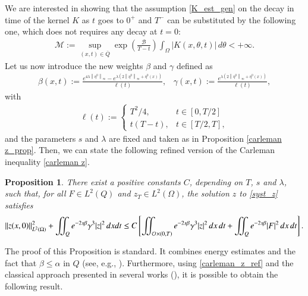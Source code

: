 \documentclass[preprint,1p]{elsarticle}
\newcommand{\D}{\displaystyle}
\newcommand{\norm}[2]{\left\|#1\right\|_{#2}}
\newcommand{\intd}{\displaystyle\int \kern -7pt \int}
\newtheorem{proposition}{\bf Proposition}[section]
\begin{document}
We are interested in showing that the assumption \eqref{K_est_gen} on the decay in time of the kernel $K$ as $t$ goes to $0^+$ and $T^-$ can be substituted by the following one, which does not requires any decay at $t=0$:
\begin{align}\label{K_est_weak}
	\mathcal{M}:=\sup_{(x,t)\in\overline{Q}}\exp\left(\frac{\mathcal{B}}{T-t}\right)\int_{\Omega} |K(x,\theta,t)|\,d\theta <+\infty.
\end{align}
Let us now introduce the new weights $\beta$ and $\gamma$ defined as
%
\begin{align*}
	\beta(x,t):=\frac{e^{4\lambda\norm{\eta^0}{\infty}}-e^{\lambda\left(2\norm{\eta^0}{\infty}+\eta^0(x)\right)}}{\ell(t)}, \;\;\; \gamma(x,t):=\frac{e^{\lambda\left(2\norm{\eta^0}{\infty}+\eta^0(x)\right)}}{\ell(t)},
\end{align*}
with
\begin{align*}
	\ell(t):=\begin{cases}
		\D T^2/4, & t\in\left[0,T/2\right]
		\\
		\D t(T-t), & t\in\left[T/2, T\right],
	\end{cases}
\end{align*}
and the parameters $s$ and $\lambda$ are fixed and taken as in Proposition \ref{carleman z_prop}. Then, we can state the following refined version of the Carleman inequality \eqref{carleman z}.

\begin{proposition}
There exist a positive constants $C$, depending on $T$, $s$ and $\lambda$, such that, for all $F\in L^2(Q)$ and $z_T\in L^2(\Omega)$, the solution $z$ to \eqref{syst_z} satisfies 
\begin{align}\label{carleman_z_ref}
	\norm{z(x,0)}{L^2(\Omega)}^2 + \intd_Q e^{-2s\beta}\gamma^3|z|^2\,dxdt \leq C \left[\intd_{\mathcal O\times(0,T)} e^{-2s\beta}\gamma^3 |z|^2\,dx\,dt + \intd_Q e^{-2s\beta}|F|^2\,dx\,dt\right].
\end{align}
\end{proposition}

The proof of this Proposition is standard. It combines energy estimates and the fact that $\beta\leq\alpha$ in $Q$ (see, e.g., \cite{fernandez2004local}). Furthermore, using \eqref{carleman_z_ref} and the classical approach presented in several works (\cite{fernandez2004local,fursikov1996controllability,gueye2013insensitizing,tao2016null}), it is possible to obtain the following result.
\end{document}
